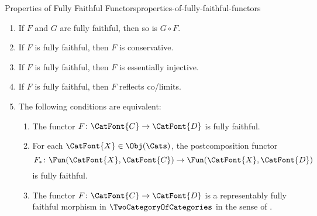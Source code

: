 \begin{proposition}{Properties of Fully Faithful Functors}{properties-of-fully-faithful-functors}
\begin{enumerate}
\begin{enumerate}
\begin{webcompile}
                    \end{webcompile}
                    in $\Cats$.
            \end{enumerate}
        \item\label{properties-of-fully-faithful-functors-interaction-with-composition}If $F$ and $G$ are fully faithful, then so is $G\circ F$.
        \item\label{properties-of-fully-faithful-functors-conservativity}If $F$ is fully faithful, then $F$ is conservative.
        \item\label{properties-of-fully-faithful-functors-essential-injectivity}If $F$ is fully faithful, then $F$ is essentially injective.
        \item\label{properties-of-fully-faithful-functors-interaction-with-co-limits}If $F$ is fully faithful, then $F$ reflects co/limits.
        \item\label{properties-of-fully-faithful-functors-interaction-with-postcomposition}The following conditions are equivalent:
            \begin{enumerate}
                \item\label{properties-of-fully-faithful-functors-interaction-with-postcomposition-a}The functor $F\colon\CatFont{C}\to\CatFont{D}$ is fully faithful.
                \item\label{properties-of-fully-faithful-functors-interaction-with-postcomposition-b}For each $\CatFont{X}\in\Obj(\Cats)$, the postcomposition functor
                    \[
                        F_{*}
                        \colon
                        \Fun(\CatFont{X},\CatFont{C})
                        \to
                        \Fun(\CatFont{X},\CatFont{D})
                    \]%
                    is fully faithful.
                \item\label{properties-of-fully-faithful-functors-interaction-with-postcomposition-c}The functor $F\colon\CatFont{C}\to\CatFont{D}$ is a representably fully faithful morphism in $\TwoCategoryOfCategories$ in the sense of .

\end{enumerate}
\end{enumerate}
\end{proposition}
